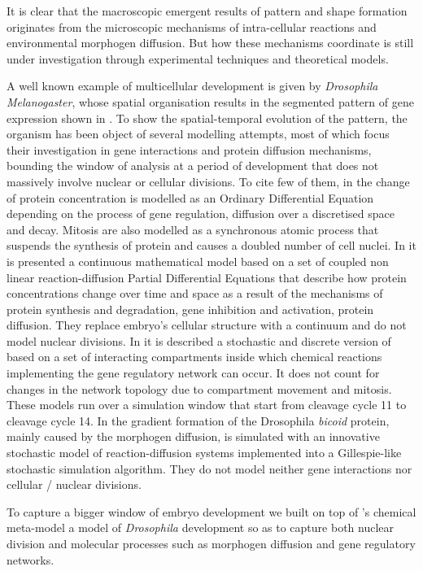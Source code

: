 \documentclass[12pt,a4paper,twoside,openright]{book}
\begin{document}
It is clear that the macroscopic emergent results of pattern and shape formation originates from the microscopic mechanisms of intra-cellular reactions and environmental morphogen diffusion.
%
But how these mechanisms coordinate is still under investigation through experimental techniques and theoretical models.

A well known example of multicellular development is given by \emph{Drosophila Melanogaster}, whose spatial organisation results in the segmented pattern of gene expression shown in  . 
%
To show the spatial-temporal evolution of the pattern, the organism has been object of several modelling attempts, most of which focus their investigation in gene interactions and protein diffusion mechanisms, bounding the window of analysis at a period of development that does not massively involve nuclear or cellular divisions. 
%
To cite few of them, in \cite{reinitz95} the change of protein concentration is modelled as an Ordinary Differential Equation depending on the process of gene regulation, diffusion over a  discretised space and decay.  Mitosis are also modelled as a synchronous  atomic process that suspends the synthesis of protein and causes a doubled number of cell nuclei.
%
In \cite{gursky04} it is presented a continuous mathematical model based on a set of coupled non linear reaction-diffusion Partial Differential Equations  that describe how protein concentrations change over time and space as a result of the mechanisms of protein synthesis and degradation, gene inhibition and activation, protein diffusion. They replace embryo's cellular structure with a continuum and do not model nuclear divisions. 
%
%
In \cite{montagna-cs2bio10} it is described a stochastic and discrete version of  \cite{gursky04} based on a set of interacting compartments inside which chemical reactions implementing the gene regulatory network can occur. It does not count for changes in the network topology due to compartment movement and mitosis.
%
These models run over a simulation window that start from cleavage cycle 11 to cleavage cycle 14.
%
In \cite{LeccaJIB2010} the gradient formation of the Drosophila \emph{bicoid} protein, mainly caused by the morphogen diffusion, is simulated with an innovative stochastic model of reaction-diffusion systems implemented into a Gillespie-like stochastic simulation algorithm. They do not model neither gene interactions nor cellular / nuclear divisions.
%

To capture a bigger window of embryo development we built on top of \alchemist{}'s chemical meta-model a model of \emph{Drosophila} development so as to capture  both nuclear division and molecular processes such as  morphogen diffusion and gene regulatory networks.
\end{document}
